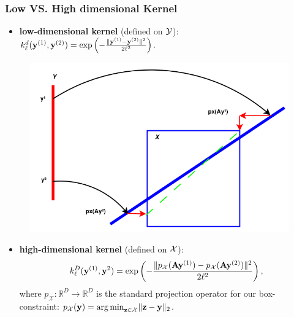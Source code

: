\documentclass[grey]{beamer}
\begin{document}
 \begin{frame}
  \frametitle{Low VS. High dimensional Kernel}
  \begin{minipage}[l]{0.56\columnwidth}
    \begin{itemize}
    \small
   \item {\bf \textcolor{myColor}{low-dimensional kernel}} (defined on 
   {\bf \textcolor{myColor}{$\cal Y$}}):\\
   $k_{\ell}^d(\mathbf{y}^{(1)},\mathbf{y}^{(2)}) = \exp\left({-\frac{\|\mathbf{y}^{(1)}-\mathbf{y}^{(2)}\|^2}{2\ell^2}}\right). $
  \end{itemize}
  \end{minipage}
 \begin{minipage}[r]{0.42\columnwidth}
  \begin{figure}
  \begin{flushright}
   \includegraphics[width=1\columnwidth]{./figs/low_high_dim.png}
   \end{flushright}
  \end{figure}
 \end{minipage}
 \begin{itemize}
 \small
  \item {\bf \textcolor{myColor}{high-dimensional kernel}} (defined on 
   {\bf \textcolor{myColor}{$\cal X$}}):  
  $$k_{\ell}^D(\mathbf{y}^{(1)}, \mathbf{y}^2) = \exp\left( -\frac{\| p_{\mathcal{X}}(\mathbf{A}\mathbf{y}^{(1)}) - p_{\mathcal{X}}(\mathbf{A}\mathbf{y}^{(2)}) \|^2}{2\ell^2} \right),$$
  where $p_{\mathcal{X}}:\mathbb{R}^D \rightarrow \mathbb{R}^D$ is the standard projection operator for our box-constraint: $p_{\mathcal{X}}(\mathbf{y}) = {\arg \min}_{\mathbf{z}\in \mathcal{X}} \|\mathbf{z}-\mathbf{y}\|_2$. 
  \end{itemize}
 \end{frame}
 
\end{document}
